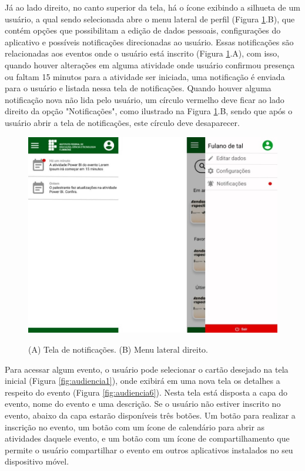 Já ao lado direito, no canto superior da tela, há o ícone exibindo a silhueta de um usuário, a qual sendo selecionada abre o menu lateral de perfil (Figura \ref{fig:audiencia4}.B), que contém opções que possibilitam a edição de dados pessoais, configurações do aplicativo e possíveis notificações direcionadas ao usuário. Essas notificações são relacionadas aos eventos onde o usuário está inscrito (Figura \ref{fig:audiencia4}.A), com isso, quando houver alterações em alguma atividade onde usuário confirmou presença ou faltam 15 minutos para a atividade ser iniciada, uma notificação é enviada para o usuário e listada nessa tela de notificações. Quando houver alguma notificação nova não lida pelo usuário, um círculo vermelho deve ficar ao lado direito da opção "Notificações", como ilustrado na Figura \ref{fig:audiencia4}.B, sendo que após o usuário abrir a tela de notificações, este círculo deve desaparecer.

\begin{figure}[H]
    \centering
    \caption{(A) Tela de notificações. (B) Menu lateral direito.}
    \includegraphics[scale=0.63]{figuras/Audiencia/4-5.jpg}
    \label{fig:audiencia4}
\end{figure}

Para acessar algum evento, o usuário pode selecionar o cartão desejado na tela inicial (Figura \ref{fig:audiencia1}), onde exibirá em uma nova tela os detalhes a respeito do evento (Figura \ref{fig:audiencia6}). Nesta tela está disposta a capa do evento, nome do evento e uma descrição. Se o usuário não estiver inscrito no evento, abaixo da capa estarão disponíveis três botões. Um botão para realizar a inscrição no evento, um botão com um ícone de calendário para abrir as atividades daquele evento, e um botão com um ícone de compartilhamento que permite o usuário compartilhar o evento em outros aplicativos instalados no seu dispositivo móvel.


